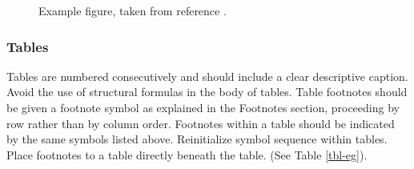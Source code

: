 \documentclass{ijuc}
\begin{document}
\begin{figure}
\begin{center}
\end{center}
\caption{Example figure, taken from reference \cite{St1}.}
\label{fig-eg}
\end{figure}




\subsubsection{Tables}

Tables are numbered consecutively and should include a clear
descriptive caption. Avoid the use of structural formulas in the body
of tables. Table footnotes should be given a footnote symbol as explained in
the Footnotes section, proceeding by row rather than by column order.
Footnotes within a table should be indicated by the same
symbols listed above. Reinitialize symbol sequence within tables. Place footnotes
to a table directly beneath the table. (See Table \ref{tbl-eg}).
\end{document}
